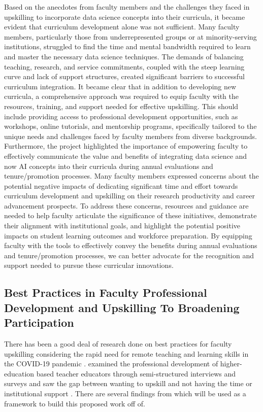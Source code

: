 \documentclass[11pt]{article}
\begin{document}
Based on the anecdotes from faculty members and the challenges they faced in upskilling to incorporate data science concepts into their curricula, it became evident that curriculum development alone was not sufficient. 
Many faculty members, particularly those from underrepresented groups or at minority-serving institutions, struggled to find the time and mental bandwidth required to learn and master the necessary data science techniques. The demands of balancing teaching, research, and service commitments, coupled with the steep learning curve and lack of support structures, created significant barriers to successful curriculum integration.
It became clear that in addition to developing new curricula, a comprehensive approach was required to equip faculty with the resources, training, and support needed for effective upskilling. This should include providing access to professional development opportunities, such as workshops, online tutorials, and mentorship programs, specifically tailored to the unique needs and challenges faced by faculty members from diverse backgrounds.
Furthermore, the project highlighted the importance of empowering faculty to effectively communicate the value and benefits of integrating data science and now AI concepts into their curricula during annual evaluations and tenure/promotion processes. Many faculty members expressed concerns about the potential negative impacts of dedicating significant time and effort towards curriculum development and upskilling on their research productivity and career advancement prospects.
To address these concerns, resources and guidance are needed to help faculty articulate the significance of these initiatives, demonstrate their alignment with institutional goals, and highlight the potential positive impacts on student learning outcomes and workforce preparation. By equipping faculty with the tools to effectively convey the benefits during annual evaluations and tenure/promotion processes, we can better advocate for the recognition and support needed to pursue these curricular innovations.

\subsection{Best Practices in Faculty Professional Development and Upskilling To Broadening Participation}

There has been a good deal of research done on best practices for faculty upskilling considering the rapid need for remote teaching and learning skills in the COVID-19 pandemic \cite{zeivots2021hybrid, laloo2020teaching, calonge2022contactless}.
\cite{macphail2019professional} examined the professional development of higher-education based teacher educators through semi-structured interviews and surveys and saw the gap between wanting to upskill and not having the time or institutional support \cite{macphail2019professional}. 
There are several findings from \cite{macphail2019professional} which will be used as a framework to build this proposed work off of.
\end{document}
